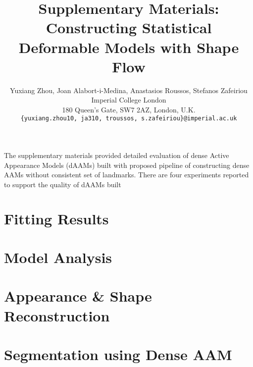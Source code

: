 






\title{Supplementary Materials: Constructing Statistical Deformable Models with Shape Flow}

\author{Yuxiang Zhou, Joan Alabort-i-Medina, Anastasios Roussos, Stefanos Zafeiriou\\
Imperial College London\\
180 Queen’s Gate, SW7 2AZ, London, U.K.\\
{\tt\small \{yuxiang.zhou10, ja310, troussos, s.zafeiriou\}@imperial.ac.uk}}
\maketitle
\thispagestyle{empty}

The supplementary materials provided detailed evaluation of dense Active Appearance Models (dAAMs) built with proposed pipeline of constructing dense AAMs without consistent set of landmarks. There are four experiments reported to support the quality of dAAMs built

\appendix
\section{Fitting Results}
\label{sec:fittingresults}

\section{Model Analysis}
\label{sec:modelanalysis}

\section{Appearance \& Shape Reconstruction}
\label{sec:reconstruct}

\section{Segmentation using Dense AAM}
\label{sec:segmentation}
    
{\small


}

